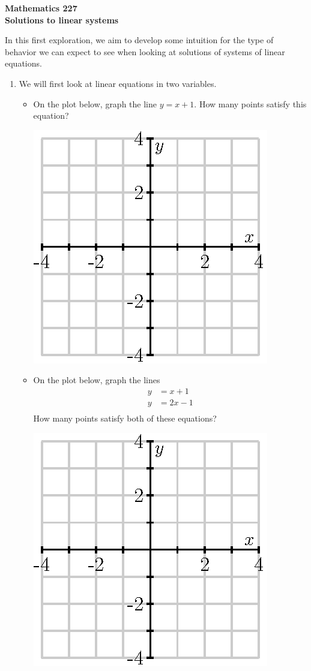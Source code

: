 \documentclass[12pt]{article}
\begin{document}
\noindent
{\bf Mathematics 227} \\ 
{\bf Solutions to linear systems}

\bigskip
In this first exploration, we aim to develop some intuition for the
type of behavior we can expect to see when looking at solutions of
systems of linear equations.

\begin{enumerate}
\item We will first look at linear equations in two variables.
  \begin{itemize}
    \item On the plot below, graph the line $y=x+1$.  How many points
      satisfy this equation?
      \begin{center}
        \includegraphics{empty-4.eps}
      \end{center}
    \item On the plot below, graph the lines
      $$
      \begin{aligned}
        y & = x + 1 \\
        y & = 2x - 1 \\
      \end{aligned}
      $$
      How many points satisfy both of these equations?
      \begin{center}
        \includegraphics{empty-4.eps}

\end{center}
\end{itemize}
\end{enumerate}
\end{document}
